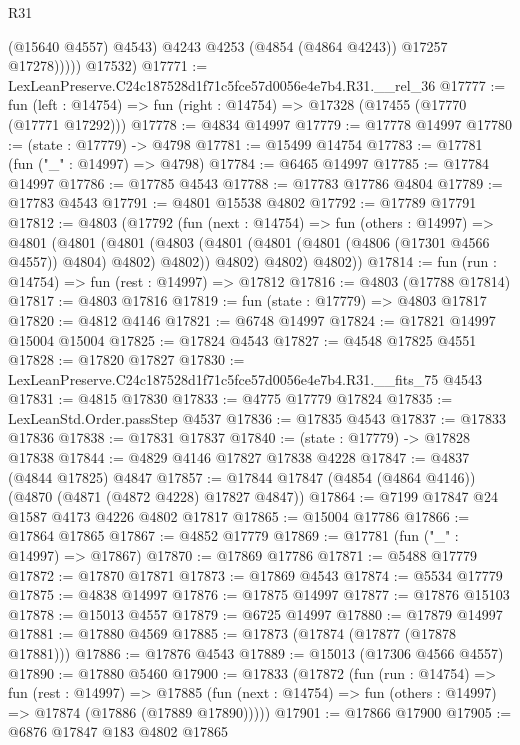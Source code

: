 \begin{lexlean}{R31}
\begin{coremodule}
                  (@15640 @4557)
                  @4543)
                @4243
                @4253
                (@4854 (@4864 @4243))
                @17257
                @17278)))))
      @17532)
@17771 := LexLeanPreserve.C24c187528d1f71c5fce57d0056e4e7b4.R31.__rel_36
@17777 := fun (left : @14754) => fun (right : @14754) => @17328 (@17455 (@17770 (@17771 @17292)))
@17778 := @4834 @14997
@17779 := @17778 @14997
@17780 := (state : @17779) -> @4798
@17781 := @15499 @14754
@17783 := @17781 (fun ("_" : @14997) => @4798)
@17784 := @6465 @14997
@17785 := @17784 @14997
@17786 := @17785 @4543
@17788 := @17783 @17786 @4804
@17789 := @17783 @4543
@17791 := @4801 @15538 @4802
@17792 := @17789 @17791
@17812 := @4803
    (@17792
      (fun (next : @14754) =>
      fun (others : @14997) =>
      @4801
        (@4801
          (@4801
            (@4803 (@4801 (@4801 (@4801 (@4806 (@17301 @4566 @4557)) @4804) @4802) @4802))
            @4802)
          @4802)
        @4802))
@17814 := fun (run : @14754) => fun (rest : @14997) => @17812
@17816 := @4803 (@17788 @17814)
@17817 := @4803 @17816
@17819 := fun (state : @17779) => @4803 @17817
@17820 := @4812 @4146
@17821 := @6748 @14997
@17824 := @17821 @14997 @15004 @15004
@17825 := @17824 @4543
@17827 := @4548 @17825 @4551
@17828 := @17820 @17827
@17830 := LexLeanPreserve.C24c187528d1f71c5fce57d0056e4e7b4.R31.__fits_75 @4543
@17831 := @4815 @17830
@17833 := @4775 @17779 @17824
@17835 := LexLeanStd.Order.passStep @4537
@17836 := @17835 @4543
@17837 := @17833 @17836
@17838 := @17831 @17837
@17840 := (state : @17779) -> @17828 @17838
@17844 := @4829 @4146 @17827 @17838 @4228
@17847 := @4837 (@4844 @17825) @4847
@17857 := @17844 @17847 (@4854 (@4864 @4146)) (@4870 (@4871 (@4872 @4228) @17827 @4847))
@17864 := @7199 @17847 @24 @1587 @4173 @4226 @4802 @17817
@17865 := @15004 @17786
@17866 := @17864 @17865
@17867 := @4852 @17779
@17869 := @17781 (fun ("_" : @14997) => @17867)
@17870 := @17869 @17786
@17871 := @5488 @17779
@17872 := @17870 @17871
@17873 := @17869 @4543
@17874 := @5534 @17779
@17875 := @4838 @14997
@17876 := @17875 @14997
@17877 := @17876 @15103
@17878 := @15013 @4557
@17879 := @6725 @14997
@17880 := @17879 @14997
@17881 := @17880 @4569
@17885 := @17873 (@17874 (@17877 (@17878 @17881)))
@17886 := @17876 @4543
@17889 := @15013 (@17306 @4566 @4557)
@17890 := @17880 @5460
@17900 := @17833
    (@17872
      (fun (run : @14754) =>
      fun (rest : @14997) =>
      @17885 (fun (next : @14754) => fun (others : @14997) => @17874 (@17886 (@17889 @17890)))))
@17901 := @17866 @17900
@17905 := @6876 @17847 @183 @4802 @17865

\end{coremodule}
\end{lexlean}
